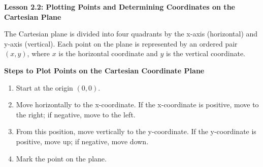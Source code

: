 \begin{center}
\textbf{Lesson 2.2: Plotting Points and Determining Coordinates on the Cartesian Plane}
\end{center}


The Cartesian plane is divided into four quadrants by the x-axis (horizontal) and y-axis (vertical). Each point on the plane is represented by an ordered pair \((x, y)\), where \(x\) is the horizontal coordinate and \(y\) is the vertical coordinate.

\noindent\textbf{Steps to Plot Points on the Cartesian Coordinate Plane}
\begin{enumerate}[label = \color{blue}\arabic*. ]
   \item Start at the origin \((0, 0)\).
   \item Move horizontally to the x-coordinate. If the x-coordinate is positive, move to the right; if negative, move to the left.
   \item From this position, move vertically to the y-coordinate. If the y-coordinate is positive, move up; if negative, move down.
   \item Mark the point on the plane.
\end{enumerate}
 
